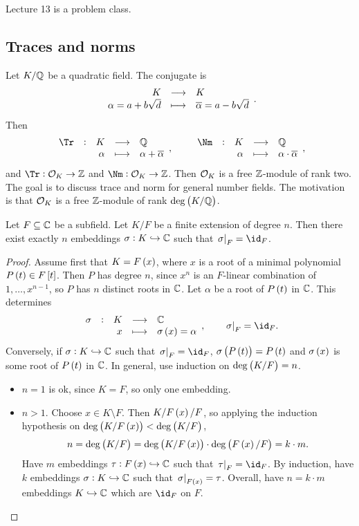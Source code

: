 
Lecture 13 is a problem class.

\subsection{Traces and norms}


Let $ K / \mathbb{Q} $ be a quadratic field. The conjugate is
$$ \function{K}{K}{\alpha = a + b\sqrt{d}}{\overline{\alpha} = a - b\sqrt{d}}. $$
Then
$$ \function[\Tr]{K}{\QQ}{\alpha}{\alpha + \overline{\alpha}}, \qquad \function[\Nm]{K}{\QQ}{\alpha}{\alpha \cdot \overline{\alpha}}, $$
and $ \Tr : \OOO_K \to \ZZ $ and $ \Nm : \OOO_K \to \ZZ $. Then $ \mathcal{O}_K $ is a free $ \mathbb{Z} $-module of rank two. The goal is to discuss trace and norm for general number fields. The motivation is that $ \mathcal{O}_K $ is a free $ \mathbb{Z} $-module of rank $ \deg \br{K / \QQ} $.

\pagebreak

\begin{proposition}
\label{prop:embeddings}
Let $ F \subseteq \mathbb{C} $ be a subfield. Let $ K / F $ be a finite extension of degree $ n $. Then there exist exactly $ n $ embeddings $ \sigma : K \hookrightarrow \mathbb{C} $ such that $ \eval{\sigma}_F = \id_F $.
\end{proposition}

\begin{proof}
Assume first that $ K = F\br{x} $, where $ x $ is a root of a minimal polynomial $ P\br{t} \in F\sbr{t} $. Then $ P $ has degree $ n $, since $ x^n $ is an $ F $-linear combination of $ 1, \dots, x^{n - 1} $, so $ P $ has $ n $ distinct roots in $ \mathbb{C} $. Let $ \alpha $ be a root of $ P\br{t} $ in $ \mathbb{C} $. This determines
$$ \function[\sigma]{K}{\CC}{x}{\sigma\br{x} = \alpha}, \qquad \eval{\sigma}_F = \id_F. $$
Conversely, if $ \sigma : K \hookrightarrow \mathbb{C} $ such that $ \eval{\sigma}_F = \id_F $, $ \sigma\br{P\br{t}} = P\br{t} $ and $ \sigma\br{x} $ is some root of $ P\br{t} $ in $ \mathbb{C} $. In general, use induction on $ \deg \br{K / F} = n $.
\begin{itemize}
\item $ n = 1 $ is ok, since $ K = F $, so only one embedding.
\item $ n > 1 $. Choose $ x \in K \setminus F $. Then $ K / F\br{x} / F $, so applying the induction hypothesis on $ \deg \br{K / F\br{x}} < \deg \br{K / F} $,
$$ n = \deg \br{K / F} = \deg \br{K / F\br{x}} \cdot \deg \br{F\br{x} / F} = k \cdot m. $$
Have $ m $ embeddings $ \tau : F\br{x} \hookrightarrow \CC $ such that $ \eval{\tau}_F = \id_F $. By induction, have $ k $ embeddings $ \sigma : K \hookrightarrow \mathbb{C} $ such that $ \eval{\sigma}_{F\br{x}} = \tau $. Overall, have $ n = k \cdot m $ embeddings $ K \hookrightarrow \mathbb{C} $ which are $ \id_F $ on $ F $.
\end{itemize}
\end{proof}


